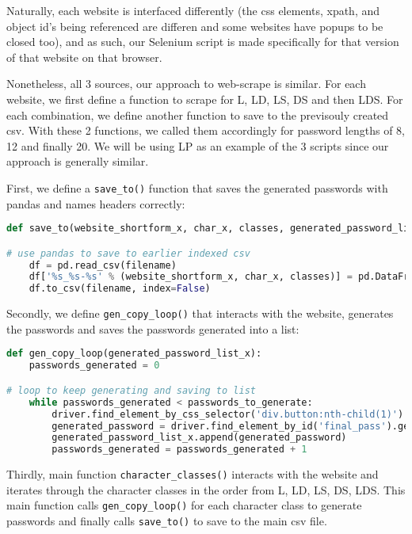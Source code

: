 \documentclass[letterpaper,twocolumn,10pt]{article}
\begin{document}
Naturally, each website is interfaced differently (the css elements, xpath, and object id's being referenced are differen and some websites have popups to be closed too), and as such, our Selenium script is made specifically for that version of that website on that browser. 

Nonetheless, all 3 sources, our approach to web-scrape is similar. For each website, we first define a function to scrape for L, LD, LS, DS and then LDS. For each combination, we define another function to save to the previsouly created csv. With these 2 functions, we called them accordingly for password lengths of 8, 12 and finally 20. We will be using LP as an example of the 3 scripts since our approach is generally similar. 

First, we define a \lstinline{save_to()} function that saves the generated passwords with pandas and names headers correctly:

\begin{lstlisting}[language=python, frame=none]
def save_to(website_shortform_x, char_x, classes, generated_password_list_x):

# use pandas to save to earlier indexed csv
    df = pd.read_csv(filename)
    df['%s_%s-%s' % (website_shortform_x, char_x, classes)] = pd.DataFrame(generated_password_list_x)
    df.to_csv(filename, index=False)
\end{lstlisting}  

Secondly, we define \lstinline{gen_copy_loop()} that interacts with the website, generates the passwords and saves the passwords generated into a list:

\begin{lstlisting}[language=python, frame=none]
def gen_copy_loop(generated_password_list_x):
    passwords_generated = 0

# loop to keep generating and saving to list
    while passwords_generated < passwords_to_generate:
        driver.find_element_by_css_selector('div.button:nth-child(1)').click()
        generated_password = driver.find_element_by_id('final_pass').get_attribute("value")
        generated_password_list_x.append(generated_password)
        passwords_generated = passwords_generated + 1
\end{lstlisting} 

Thirdly, main function \lstinline{character_classes()} interacts with the website and iterates through the character classes in the order from L, LD, LS, DS, LDS. This main function calls \lstinline{gen_copy_loop()} for each character class to generate passwords and finally calls \lstinline{save_to()} to save to the main csv file.
\end{document}

